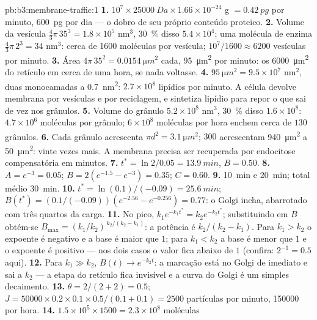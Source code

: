 \begin{solution}{pb:b3:membrane-traffic:1}
\textbf{1.} $10^{7}\times \qty{25000}{Da}\times 1.66\times 10^{-24}$ g
$= \qty{0.42}{pg}$ por minuto, \qty{600}{pg} por dia --- o dobro de seu
próprio conteúdo proteico.
\textbf{2.} Volume da vesícula $\tfrac{4}{3}\pi\,35^{3} = 1.8\times 10^{5}$
nm$^{3}$, \qty{30}{\%} disso $5.4\times 10^{4}$; uma molécula de enzima
$\tfrac{4}{3}\pi\,2^{3} = 34$ nm$^{3}$: cerca de \num{1600} moléculas
por vesícula; $10^{7}/1600 \approx 6200$ vesículas por minuto.
\textbf{3.} Área $4\pi\,35^{2} = \qty{0.0154}{\micro m^2}$ cada,
\qty{95}{\micro m^2} por minuto: os \qty{6000}{\micro m^2} do retículo
em cerca de uma hora, se nada voltasse.
\textbf{4.} $\qty{95}{\micro m^2} = 9.5\times 10^{7}$ nm$^{2}$, duas
monocamadas a \qty{0.7}{nm^2}: $2.7\times 10^{8}$ lipídios por minuto. A
célula devolve membrana por vesículas  e por reciclagem, e
sintetiza lipídio para repor o que sai de vez nos grânulos.
\textbf{5.} Volume do grânulo $5.2\times 10^{8}$ nm$^{3}$, \qty{30}{\%}
disso $1.6\times 10^{8}$: $4.7\times 10^{6}$ moléculas por grânulo;
$6\times
10^{8}$ moléculas por hora enchem cerca de $130$ grânulos.
\textbf{6.} Cada grânulo acrescenta $\pi d^{2} = \qty{3.1}{\micro m^2}$;
$300$ acrescentam \qty{940}{\micro m^2} a \qty{50}{\micro m^2}: vinte
vezes mais. A membrana precisa ser recuperada por endocitose
compensatória em minutos.
\textbf{7.} $t^{*} = \ln 2/0.05 = \qty{13.9}{min}$, $B = 0.50$.
\textbf{8.} $A = e^{-3} = 0.05$; $B = 2(e^{-1.5} - e^{-3}) = 0.35$;
$C = 0.60$.
\textbf{9.} \qty{10}{min} e \qty{20}{min}; total médio \qty{30}{min}.
\textbf{10.} $t^{*} = \ln(0.1)/(-0.09) = \qty{25.6}{min}$; $B(t^{*}) =
(0.1/(-0.09))(e^{-2.56} - e^{-0.256}) = 0.77$: o Golgi incha,
abarrotado com três quartos da carga.
\textbf{11.} No pico, $k_{1}e^{-k_{1}t^{*}} = k_{2}e^{-k_{2}t^{*}}$;
substituindo em $B$ obtém-se $B_{\max} = (k_{1}/k_{2})^{\,k_{2}/(k_{2} -
k_{1})}$: a potência é $k_{2}/(k_{2} - k_{1})$. Para $k_{1} > k_{2}$ o
expoente é negativo e a base é maior que $1$; para $k_{1} < k_{2}$ a
base é menor que $1$ e o expoente é positivo --- nos dois casos o valor
fica abaixo de $1$ (confira: $2^{-1} = 0.5$ aqui).
\textbf{12.} Para $k_{1} \gg k_{2}$, $B(t) \to e^{-k_{2}t}$: a marcação
está no Golgi de imediato e sai a $k_{2}$ --- a etapa do retículo fica
invisível e a curva do Golgi é um simples decaimento.
\textbf{13.} $\theta = 2/(2+2) = 0.5$; $J = \num{50000}\times 0.2\times
0.1\times 0.5/(0.1 + 0.1) = 2500$ partículas por minuto, \num{150000}
por hora.
\textbf{14.} $1.5\times 10^{5}\times 1500 = 2.3\times 10^{8}$ moléculas

\end{solution}
